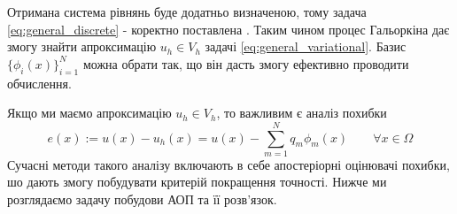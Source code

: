 Отримана система рівнянь буде додатньо визначеною, тому задача \eqref{eq:general_discrete} - коректно поставлена \cite{OstShynAee11}. Таким чином процес Гальоркіна дає змогу знайти апроксимацію $u_h \in V_h$ задачі
\eqref{eq:general_variational}. Базис $\lbrace \phi_i(x)\rbrace_{i=1}^N$ можна обрати так, що він дасть змогу ефективно проводити обчислення.


Якщо ми маємо апроксимацію $u_h \in V_h$, то важливим є аналіз похибки
%
\begin{equation}
	e(x) := u(x) - u_h(x) = u(x) - \sum\limits_{m=1}^N q_m \phi_m (x) \qquad \forall x \in \Omega
\end{equation}
%
Сучасні методи такого аналізу включають в себе апостеріорні оцінювачі похибки, шо дають змогу побудувати критерій покращення точності.
Нижче ми розглядаємо задачу побудови АОП та її розв'язок.
